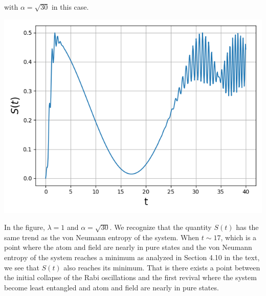 \documentclass[11pt, oneside]{book}
\theoremstyle{break}
\theoremstyle{break}
\begin{document}
with $\alpha = \sqrt{30}$ in this case. \\
\begin{center}
\includegraphics[scale=0.59]{542HW6/S(t)}
\end{center}
In the figure, $\lambda = 1$ and $\alpha = \sqrt{30}$. We recognize that the quantity $S(t)$ has the same trend as the von Neumann entropy of the system. When $t \sim 17$, which is a point where the atom and field are nearly in pure states and the von Neumann entropy of the system reaches a minimum as analyzed in Section 4.10 in the text, we see that $S(t)$ also reaches its minimum. That is there exists a point between the initial collapse of the
Rabi oscillations and the first revival where the system become least entangled and atom and field are nearly in pure states. 
\end{document}
